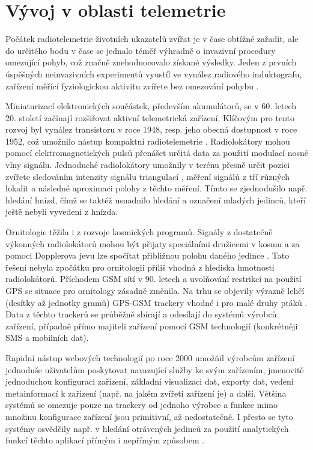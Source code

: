 \section{Vývoj v oblasti telemetrie}

Počátek radiotelemetrie životních ukazatelů zvířat je v čase obtížné zařadit, ale do určitého bodu v čase se jednalo téměř výhradně o invazivní procedury omezující pohyb, což značně znehodnocovalo získané výsledky. Jeden z prvních úspěšných neinvazivních experimentů vyustíl ve vynález radiového induktografu, zařízení měřící fyziologickou aktivitu zvířete bez omezování pohybu \cite{fuller1948radio}.

Miniaturizací elektronických součástek, především akumulátorů, se v 60. letech 20. století začínají rozšiřovat aktivní telemetrická zařízení. Klíčovým pro tento rozvoj byl vynález transistoru v roce 1948, resp. jeho obecná dostupnost v roce 1952, což umožnilo nástup kompaktní radiotelemetrie \cite{amlaner2013handbook}. Radiolokátory mohou pomocí elektromagnetických pulsů přenášet určitá data za použití modulací nosné vlny signálu. Jednoduché radiolokátory umožnily v terénu přesně určit pozici zvířete sledováním intenzity signálu triangulací \cite{Farve2014}, měření signálů z tří různých lokalit a následné aproximaci polohy z těchto měření. Tímto se zjednodušilo např. hledání hnízd, čímž se taktéž usnadnilo hledání a označení mladých jedinců, kteří ještě nebyli vyvedeni z hnízda.


Ornitologie těžila i z rozvoje kosmických programů. Signály z dostatečně výkonných radiolokátorů mohou být přijaty speciálními družicemi v kosmu a za pomoci Dopplerova jevu lze spočítat přibližnou polohu daného jedince \cite{Farve2014}. Tato řešení nebyla zpočátku pro ornitologii příliš vhodná z hlediska hmotnosti radiolokátorů. Příchodem GSM sítí v 90. letech a uvolňování restrikcí na použití GPS se situace pro ornitology zásadně změnila. Na trhu se objevily výrazně lehčí (desítky až jednotky gramů) GPS-GSM trackery vhodné i pro malé druhy ptáků \cite{sokolov2011modern}. Data z těchto trackerů se průběžně sbírají a odesílají do systémů výrobců zařízení, případně přímo majiteli zařízení pomocí GSM technologií (konkrétněji SMS a mobilních dat).

Rapidní nástup webových technologií po roce 2000 umožňil výrobcům zařízení jednoduše uživatelům poskytovat navazující služby ke svým zařízením, jmenovitě jednoduchou konfiguraci zařízení, základní visualizaci dat, exporty dat, vedení metainformací k zařízení (např. na jakém zvířeti zařízení je) a další. Většina systémů se omezuje pouze na trackery od jednoho výrobce a funkce mimo množinu konfigurace zařízení jsou primitivní, až nedostatečné. I přesto se tyto systémy osvědčily např. v hledání otrávených jedinců za použití analytických funkcí těchto aplikací přímým i nepřímým způsobem \cite{stoynov2018early}.

